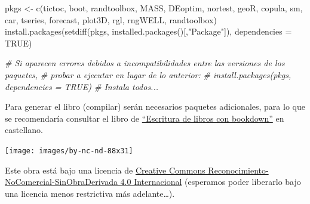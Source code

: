 \documentclass[
]{book}
\newenvironment{Shaded}{\begin{snugshade}}{\end{snugshade}}
\newcommand{\AttributeTok}[1]{\textcolor[rgb]{0.77,0.63,0.00}{#1}}
\newcommand{\CommentTok}[1]{\textcolor[rgb]{0.56,0.35,0.01}{\textit{#1}}}
\newcommand{\ConstantTok}[1]{\textcolor[rgb]{0.00,0.00,0.00}{#1}}
\newcommand{\FunctionTok}[1]{\textcolor[rgb]{0.00,0.00,0.00}{#1}}
\newcommand{\NormalTok}[1]{#1}
\newcommand{\OtherTok}[1]{\textcolor[rgb]{0.56,0.35,0.01}{#1}}
\newcommand{\StringTok}[1]{\textcolor[rgb]{0.31,0.60,0.02}{#1}}
\theoremstyle{break}
\theoremstyle{definition}
\theoremstyle{definition}
\theoremstyle{definition}
\theoremstyle{definition}
\theoremstyle{remark}
\begin{document}
\begin{Shaded}
\begin{Highlighting}[]
\NormalTok{pkgs }\OtherTok{\textless{}{-}} \FunctionTok{c}\NormalTok{(}\StringTok{\textquotesingle{}tictoc\textquotesingle{}}\NormalTok{, }\StringTok{\textquotesingle{}boot\textquotesingle{}}\NormalTok{, }\StringTok{\textquotesingle{}randtoolbox\textquotesingle{}}\NormalTok{, }\StringTok{\textquotesingle{}MASS\textquotesingle{}}\NormalTok{, }\StringTok{\textquotesingle{}DEoptim\textquotesingle{}}\NormalTok{, }\StringTok{\textquotesingle{}nortest\textquotesingle{}}\NormalTok{, }\StringTok{\textquotesingle{}geoR\textquotesingle{}}\NormalTok{, }\StringTok{\textquotesingle{}copula\textquotesingle{}}\NormalTok{,}
          \StringTok{\textquotesingle{}sm\textquotesingle{}}\NormalTok{, }\StringTok{\textquotesingle{}car\textquotesingle{}}\NormalTok{, }\StringTok{\textquotesingle{}tseries\textquotesingle{}}\NormalTok{, }\StringTok{\textquotesingle{}forecast\textquotesingle{}}\NormalTok{, }\StringTok{\textquotesingle{}plot3D\textquotesingle{}}\NormalTok{, }\StringTok{\textquotesingle{}rgl\textquotesingle{}}\NormalTok{, }\StringTok{\textquotesingle{}rngWELL\textquotesingle{}}\NormalTok{, }\StringTok{\textquotesingle{}randtoolbox\textquotesingle{}}\NormalTok{)}
\FunctionTok{install.packages}\NormalTok{(}\FunctionTok{setdiff}\NormalTok{(pkgs, }\FunctionTok{installed.packages}\NormalTok{()[,}\StringTok{"Package"}\NormalTok{]), }
                 \AttributeTok{dependencies =} \ConstantTok{TRUE}\NormalTok{)}

\CommentTok{\# Si aparecen errores debidos a incompatibilidades entre las versiones de los paquetes, }
\CommentTok{\# probar a ejecutar en lugar de lo anterior:}
\CommentTok{\# install.packages(pkgs, dependencies = TRUE) \# Instala todos...}
\end{Highlighting}
\end{Shaded}

Para generar el libro (compilar) serán necesarios paquetes adicionales,
para lo que se recomendaría consultar el libro de \href{https://rubenfcasal.github.io/bookdown_intro}{``Escritura de libros con bookdown''} en castellano.

\texttt{[image: images/by-nc-nd-88x31]}

Este obra está bajo una licencia de \href{https://creativecommons.org/licenses/by-nc-nd/4.0/deed.es_ES}{Creative Commons Reconocimiento-NoComercial-SinObraDerivada 4.0 Internacional}
(esperamos poder liberarlo bajo una licencia menos restrictiva más adelante\ldots).
\end{document}
